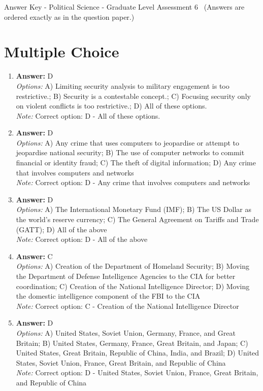 \documentclass[12pt]{article}
\begin{document}
\begin{center}
Answer Key - Political Science - Graduate Level Assessment 6 \
\small (Answers are ordered exactly as in the question paper.)
\end{center}

\section*{Multiple Choice}
\begin{enumerate}[label=\arabic*.]
\item \textbf{Answer:} D
\\ \textit{Options:} A) Limiting security analysis to military engagement is too restrictive.; B) Security is a contestable concept.; C) Focusing security only on violent conflicts is too restrictive.; D) All of these options.
\\ \textit{Note:} Correct option: D - All of these options.
\item \textbf{Answer:} D
\\ \textit{Options:} A) Any crime that uses computers to jeopardise or attempt to jeopardise national security; B) The use of computer networks to commit financial or identity fraud; C) The theft of digital information; D) Any crime that involves computers and networks
\\ \textit{Note:} Correct option: D - Any crime that involves computers and networks
\item \textbf{Answer:} D
\\ \textit{Options:} A) The International Monetary Fund (IMF); B) The US Dollar as the world's reserve currency; C) The General Agreement on Tariffs and Trade (GATT); D) All of the above
\\ \textit{Note:} Correct option: D - All of the above
\item \textbf{Answer:} C
\\ \textit{Options:} A) Creation of the Department of Homeland Security; B) Moving the Department of Defense Intelligence Agencies to the CIA for better coordination; C) Creation of the National Intelligence Director; D) Moving the domestic intelligence component of the FBI to the CIA
\\ \textit{Note:} Correct option: C - Creation of the National Intelligence Director
\item \textbf{Answer:} D
\\ \textit{Options:} A) United States, Soviet Union, Germany, France, and Great Britain; B) United States, Germany, France, Great Britain, and Japan; C) United States, Great Britain, Republic of China, India, and Brazil; D) United States, Soviet Union, France, Great Britain, and Republic of China
\\ \textit{Note:} Correct option: D - United States, Soviet Union, France, Great Britain, and Republic of China
\end{enumerate}
\end{document}
